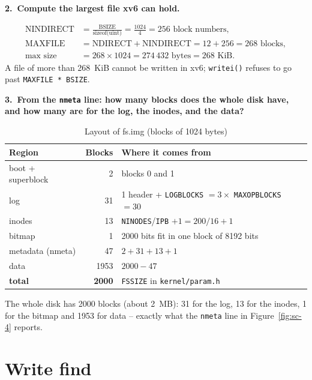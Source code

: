 \documentclass[12pt,a4paper]{article}
\newcommand{\val}[1]{#1}
\newcommand{\qa}[2]{%
  \par\needspace{5\baselineskip}\medskip
  \noindent\textbf{#1.~#2}\par\smallskip\noindent}
\begin{document}
\qa{2}{Compute the largest file xv6 can hold.}
\begin{align*}
  \text{NINDIRECT} &= \frac{\text{BSIZE}}{\text{sizeof(uint)}} = \frac{1024}{4} = 256 \text{ block numbers},\\
  \text{MAXFILE} &= \text{NDIRECT} + \text{NINDIRECT} = 12 + 256 = 268 \text{ blocks},\\
  \text{max size} &= 268 \times 1024 = 274\,432 \text{ bytes} = 268 \text{ KiB}.
\end{align*}
A file of more than 268~KiB cannot be written in xv6; \texttt{writei()} refuses to go past \texttt{MAXFILE * BSIZE}.

\qa{3}{From the \texttt{nmeta} line: how many blocks does the whole disk have, and how many are for the log, the inodes, and the data?}

\begin{table}[H]
  \centering
  \caption{Layout of fs.img (blocks of 1024 bytes)}
  \begin{tabular}{lrl}
    \toprule
    \textbf{Region} & \textbf{Blocks} & \textbf{Where it comes from} \\
    \midrule
    boot + superblock & 2    & blocks 0 and 1 \\
    log               & \val{31}   & 1 header + \texttt{LOGBLOCKS} $= 3 \times$ \texttt{MAXOPBLOCKS} $= 30$ \\
    inodes            & \val{13}   & \texttt{NINODES}/\texttt{IPB} $+ 1 = 200/16 + 1$ \\
    bitmap            & \val{1}    & \val{2000} bits fit in one block of 8192 bits \\
    \midrule
    metadata (nmeta)  & \val{47}   & $2 + 31 + 13 + 1$ \\
    data              & \val{1953} & $2000 - 47$ \\
    \midrule
    \textbf{total}    & \textbf{\val{2000}} & \texttt{FSSIZE} in \texttt{kernel/param.h} \\
    \bottomrule
  \end{tabular}
\end{table}

The whole disk has \val{2000} blocks (about 2~MB): \val{31} for the log, \val{13} for the inodes, \val{1} for the bitmap and \val{1953} for data -- exactly what the \texttt{nmeta} line in Figure~\ref{fig:sc-4} reports.

\newpage
\section{Write find}
\end{document}
